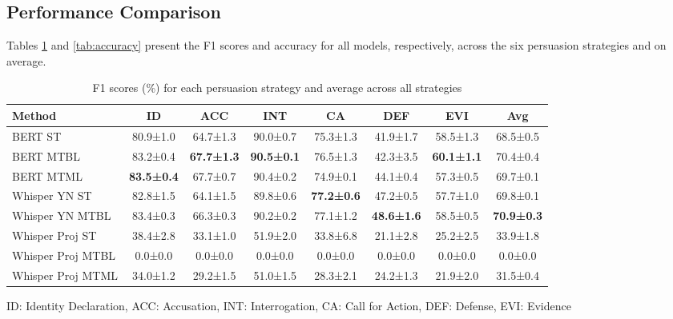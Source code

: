 \documentclass{article}
\begin{document}
\subsection{Performance Comparison}
Tables \ref{tab:f1_scores} and \ref{tab:accuracy} present the F1 scores and accuracy for all models, respectively, across the six persuasion strategies and on average.

\begin{table}[ht]
\centering
\small
\caption{F1 scores (\%) for each persuasion strategy and average across all strategies}
\label{tab:f1_scores}
\setlength{\tabcolsep}{4pt}
\begin{tabular}{@{}lccccccc@{}}
\toprule
Method & ID & ACC & INT & CA & DEF & EVI & Avg \\
\midrule
BERT ST & 80.9±1.0 & 64.7±1.3 & 90.0±0.7 & 75.3±1.3 & 41.9±1.7 & 58.5±1.3 & 68.5±0.5 \\
BERT MTBL & 83.2±0.4 & \textbf{67.7±1.3} & \textbf{90.5±0.1} & 76.5±1.3 & 42.3±3.5 & \textbf{60.1±1.1} & 70.4±0.4 \\
BERT MTML & \textbf{83.5±0.4} & 67.7±0.7 & 90.4±0.2 & 74.9±0.1 & 44.1±0.4 & 57.3±0.5 & 69.7±0.1 \\
Whisper YN ST & 82.8±1.5 & 64.1±1.5 & 89.8±0.6 & \textbf{77.2±0.6} & 47.2±0.5 & 57.7±1.0 & 69.8±0.1 \\
Whisper YN MTBL & 83.4±0.3 & 66.3±0.3 & 90.2±0.2 & 77.1±1.2 & \textbf{48.6±1.6} & 58.5±0.5 & \textbf{70.9±0.3} \\
Whisper Proj ST & 38.4±2.8 & 33.1±1.0 & 51.9±2.0 & 33.8±6.8 & 21.1±2.8 & 25.2±2.5 & 33.9±1.8 \\
Whisper Proj MTBL & 0.0±0.0 & 0.0±0.0 & 0.0±0.0 & 0.0±0.0 & 0.0±0.0 & 0.0±0.0 & 0.0±0.0 \\
Whisper Proj MTML & 34.0±1.2 & 29.2±1.5 & 51.0±1.5 & 28.3±2.1 & 24.2±1.3 & 21.9±2.0 & 31.5±0.4 \\
\bottomrule
\end{tabular}
\parbox{\textwidth}{\small ID: Identity Declaration, ACC: Accusation, INT: Interrogation, CA: Call for Action, DEF: Defense, EVI: Evidence}
\end{table}
\end{document}
